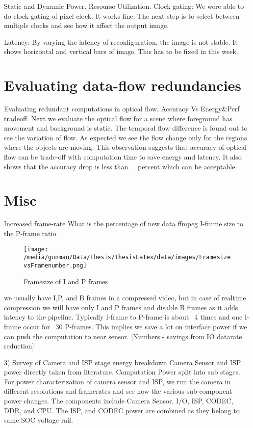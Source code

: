 Static and Dynamic Power. Resourse Utilization. 
Clock gating:
We were able to do clock gating of pixel clock. It works fine. The next step is to select between multiple clocks and see how it affect the output image.

Latency:
By varying the latency of reconfiguration, the image is not stable. It shows horizontal and vertical bars of image. This has to be fixed in this week. 


\section{Evaluating data-flow redundancies}
Evaluating redundant computations in optical flow. 
Accuracy Vs Energy\&Perf tradeoff. 
Next we evaluate the optical flow for a scene where foreground has movement and background is static. The temporal flow difference is found out to see the variation of flow. As expected we see the flow change only for the regions where the objects are moving. This observation suggests that accuracy of optical flow can be trade-off with computation time to save energy and latency. It also shows that the accuracy drop is less than \_ percent which can be acceptable


\section{Misc}

	
Increased frame-rate\newline
What is the percentage of new data
ffmpeg I-frame size to the P-frame ratio.
\begin{figure*}
	\begin{center}
		\texttt{[image: /media/gunman/Data/thesis/ThesisLatex/data/images/FramesizevsFramenumber.png]}
		\caption{Framesize of I and P frames}
		\label{fig:ex_4_9}
	\end{center}
	\vspace{-0.3in}
\end{figure*} 
we usually have I,P, and B frames in a compressed video, but in case of realtime compression we will have only I and P frames and disable B frames as it adds latency to the pipeline. Typically I-frame to P-frame is about ~4 times and one I-frame occur for ~30 P-frames. This implies we save a lot on interface power if we can push the computation to near sensor.  
[Numbers - savings from IO datarate reduction]

3) Survey of Camera and ISP stage energy breakdown
Camera Sensor and ISP power directly taken from literature.
Computation Power split into sub stages. \newline
For power characterization of camera sensor and ISP, we run the camera in different resolutions and framerates and see how the various sub-component power changes. The components include Camera Sensor, I/O, ISP, CODEC, DDR, and CPU. The ISP, and CODEC power are combined as they belong to same SOC voltage rail.

